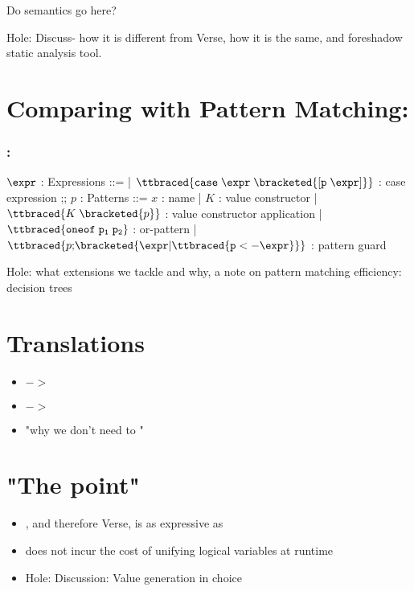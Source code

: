 \documentclass[]{article}
\begin{document}
    Do semantics go here? 

    Hole: Discuss- how it is different from Verse, how it is the same, and
    foreshadow static analysis tool. 
\section{Comparing with Pattern Matching: {\PPlus}}

\subsubsection{{\PPlus}:}
\begin{center}
    \begin{bnf}
$\expr$ : \textsf{Expressions} ::=
    | $\ttbraced{\tt{case}\; \expr\; \bracketed{\tt{[} p\; \expr \tt{]}}}$ : case expression 
    ;;
    $p$ : \textsf{Patterns} ::= $x$ : name 
    | $K$ : value constructor 
    | $\ttbraced{K\; \bracketed{p}}$ : value constructor application 
    | $\ttbraced{\tt{oneof}\; p_{1}\;  p_{2} }$ : or-pattern 
    | $\ttbraced{p \tt{;} \bracketed{\expr \vert \ttbraced{p  <- \expr}}}$ : pattern guard
    \end{bnf}
\end{center}
    Hole: what extensions we tackle and why, a note on pattern matching
     efficiency: decision trees

\section{Translations}

\begin{itemize}
    \item {\PPlus} $->$ {\VMinus} 
    \item {\VMinus} $->$ {\D}
    \item "why we don't need {\PPlus} to {\D}"
\end{itemize}

\section{"The point"}


\begin{itemize}
    \item {\VMinus}, and therefore Verse, is as expressive as {\PPlus}
    \item {\VMinus} does not incur the cost of unifying logical variables at runtime 
    \item Hole: Discussion: Value generation in choice 
\end{itemize}
\end{document}
